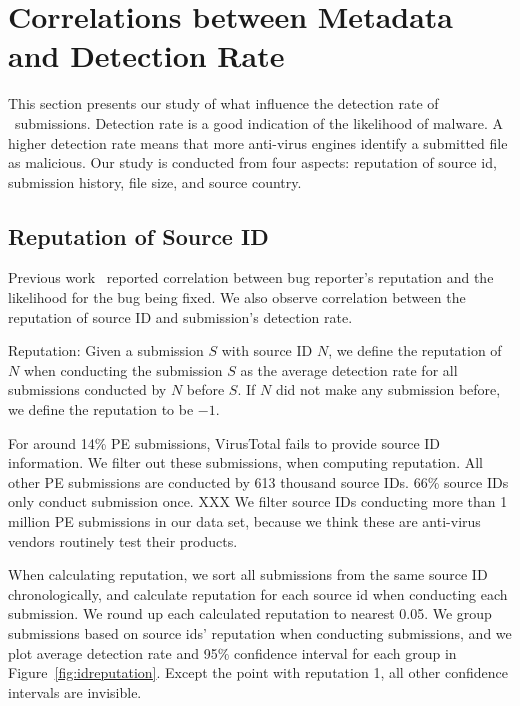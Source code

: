 \section{Correlations between Metadata and Detection Rate}
\label{sec:corr}
This section presents our study of what influence the detection rate of \pe\ submissions.
Detection rate is a good indication of the likelihood of malware.
A higher detection rate means that more anti-virus engines identify a submitted file as malicious.
Our study is conducted from four aspects: reputation of source id, submission history, 
file size, and source country.



\subsection{Reputation of Source ID}
\label{sec:reputation}

Previous work~\cite{GuoICSE2010} reported correlation between bug reporter’s reputation and the likelihood for the bug being fixed. 
We also observe correlation between the reputation of source ID and submission’s detection rate. 

\begin{definition}{Reputation:}
Given a submission $S$ with source ID $N$, 
we define the reputation of $N$ when conducting the submission $S$ as the average detection rate for all submissions conducted by $N$ before $S$. 
If $N$ did not make any submission before, we define the reputation to be $-1$. 
\end{definition}

For around 14\% PE submissions, VirusTotal fails to provide source ID information. 
We filter out these submissions, when computing reputation.
All other PE submissions are conducted by 613 thousand source IDs. 
66\% source IDs only conduct submission once. 
XXX
We filter source IDs conducting more than 1 million PE submissions in our data set, 
because we think these are anti-virus vendors routinely test their products. 

When calculating reputation, we sort all submissions from the same source ID chronologically, 
and calculate reputation for each source id when conducting each submission. 
We round up each calculated reputation to nearest 0.05. 
We group submissions based on source ids' reputation when conducting submissions, 
and we plot average detection rate and 95\% confidence interval for each group in Figure~\ref{fig:idreputation}. 
Except the point with reputation 1, all other confidence intervals are invisible.  

